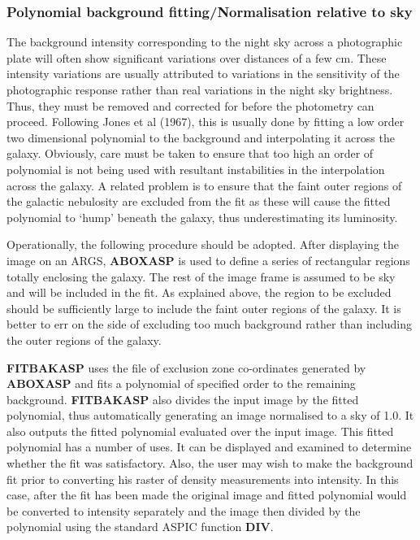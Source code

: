 \subsubsection {Polynomial background fitting/Normalisation relative to sky}
The background intensity corresponding to the night sky across a photographic
plate will often show significant variations over distances of a few cm.
These intensity variations are usually attributed to variations in the
sensitivity of the photographic response rather than real variations in the
night sky brightness.
Thus, they must be removed and corrected for before the photometry can proceed.
Following Jones et al (1967), this is usually done by fitting a low order two
dimensional polynomial to the background and interpolating it across the galaxy.
Obviously, care must be taken to ensure that too high an order of polynomial is
not being used with resultant instabilities in the interpolation across the
galaxy.
A related problem is to ensure that the faint outer regions of the galactic
nebulosity are excluded from the fit as these will cause the fitted polynomial
to `hump' beneath the galaxy, thus underestimating its luminosity.

Operationally, the following procedure should be adopted.
After displaying the image on an ARGS, {\bf ABOXASP} is used to define a series
of rectangular regions totally enclosing the galaxy.
The rest of the image frame is assumed to be sky and will be included in the
fit.
As explained above, the region to be excluded should be sufficiently large to
include the faint outer regions of the galaxy.
It is better to err on the side of excluding too much background rather than
including the outer regions of the galaxy.

{\bf FITBAKASP} uses the file of exclusion zone co-ordinates generated by
{\bf ABOXASP} and fits a polynomial of specified order to the remaining
background.
{\bf FITBAKASP} also divides the input image by the fitted polynomial, thus
automatically generating an image normalised to a sky of 1.0.
It also outputs the fitted polynomial evaluated over the input image.
This fitted polynomial has a number of uses.
It can be displayed and examined to determine whether the fit was satisfactory.
Also, the user may wish to make the background fit prior to converting his
raster of density measurements into intensity.
In this case, after the fit has been made the original image and fitted
polynomial would be converted to intensity separately and the image then divided
by the polynomial using the standard ASPIC function {\bf DIV}.

